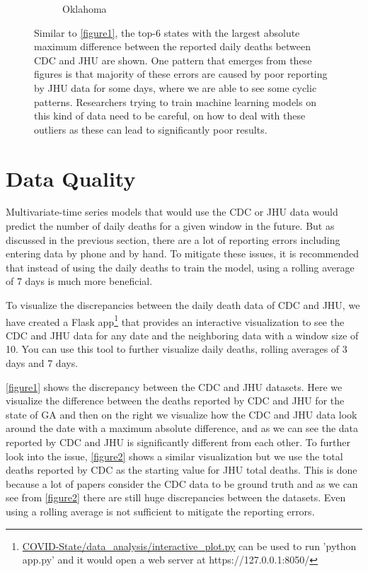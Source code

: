 \documentclass[11pt,twocolumn,letterpaper]{article}
\begin{document}
\begin{figure}
\begin{subfigure}{0.48\linewidth}
\begin{subfigure}{0.48\linewidth}
\begin{subfigure}{\linewidth}
            \vfill
        \end{subfigure}
    \end{subfigure}
    \caption{Oklahoma}
\end{subfigure}
\caption{Similar to \cref{figure1}, the top-6 states with the largest absolute maximum difference between the reported daily deaths between CDC and JHU are shown. One pattern that emerges from these figures is that majority of these errors are caused by poor reporting by JHU data for some days, where we are able to see some cyclic patterns. Researchers trying to train machine learning models on this kind of data need to be careful, on how to deal with these outliers as these can lead to significantly poor results.}
\label{figure3}
\end{figure}

\section{Data Quality}

Multivariate-time series models that would use the CDC or JHU data would predict the number of daily deaths for a given window in the future. But as discussed in the previous section, there are a lot of reporting errors including entering data by phone and by hand. To mitigate these issues, it is recommended that instead of using the daily deaths to train the model, using a rolling average of 7 days is much more beneficial.

To visualize the discrepancies between the daily death data of CDC and JHU, we have created a Flask app\footnote{\href{https://github.com/scalation/data/blob/master/COVID-State/data_analysis/interactive_plot.py}{COVID-State/data\_analysis/interactive\_plot.py} can be used to run 'python app.py' and it would open a web server at https://127.0.0.1:8050/} that provides an interactive visualization to see the CDC and JHU data for any date and the neighboring data with a window size of 10. You can use this tool to further visualize daily deaths, rolling averages of 3 days and 7 days.

\cref{figure1} shows the discrepancy between the CDC and JHU datasets. Here we visualize the difference between the deaths reported by CDC and JHU for the state of GA and then on the right we visualize how the CDC and JHU data look around the date with a maximum absolute difference, and as we can see the data reported by CDC and JHU is significantly different from each other. To further look into the issue, \cref{figure2} shows a similar visualization but we use the total deaths reported by CDC as the starting value for JHU total deaths. This is done because a lot of papers consider the CDC data to be ground truth and as we can see from \cref{figure2} there are still huge discrepancies between the datasets. Even using a rolling average is not sufficient to mitigate the reporting errors.
\end{document}
